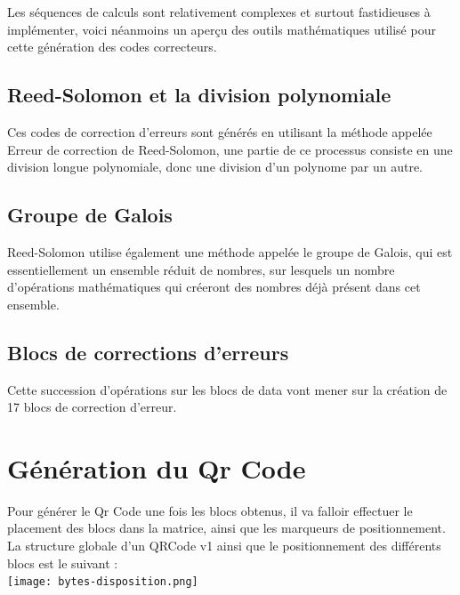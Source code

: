 \documentclass{report}
\begin{document}
		Les séquences de calculs sont relativement complexes et surtout fastidieuses à implémenter, voici néanmoins un aperçu des outils mathématiques utilisé pour cette génération des codes correcteurs.\\

		\subsection{Reed-Solomon et la division polynomiale}

			Ces codes de correction d'erreurs sont générés en utilisant la méthode appelée Erreur de correction de Reed-Solomon, une partie de ce processus consiste en une division longue polynomiale, donc une division d'un polynome par un autre.\\

		\subsection{Groupe de Galois}

			Reed-Solomon utilise également une méthode appelée le groupe de Galois, qui est essentiellement un ensemble réduit de nombres, sur lesquels un nombre d'opérations mathématiques qui créeront des nombres déjà présent dans cet ensemble.\\

		\subsection{Blocs de corrections d'erreurs}

			Cette succession d'opérations sur les blocs de data vont mener sur la création de 17 blocs de correction d'erreur.\\

	\section{Génération du Qr Code}

		Pour générer le Qr Code une fois les blocs obtenus, il va falloir effectuer le placement des blocs dans la matrice, ainsi que les marqueurs de positionnement.\\

		La structure globale d'un QRCode v1 ainsi que le positionnement des différents blocs est le suivant : \\

		\texttt{[image: bytes-disposition.png]}\\
\end{document}
